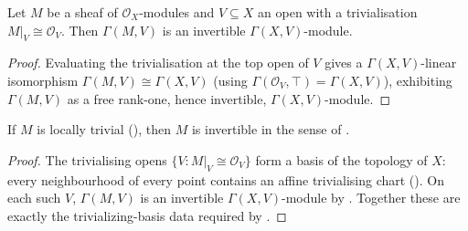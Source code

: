 \begin{lemma}
  \label{lem:isInvertible_of_restrict_iso}
  \leanok
  Let \(M\) be a sheaf of \(\mathcal{O}_X\)-modules and \(V \subseteq X\)
  an open with a trivialisation \(M|_V \cong \mathcal{O}_V\). Then
  \(\Gamma(M, V)\) is an invertible \(\Gamma(X, V)\)-module.
\end{lemma}
\begin{proof}
  \leanok
  Evaluating the trivialisation at the top open of \(V\) gives a
  \(\Gamma(X,V)\)-linear isomorphism \(\Gamma(M, V) \cong \Gamma(X, V)\)
  (using \(\Gamma(\mathcal{O}_V, \top) = \Gamma(X, V)\)), exhibiting
  \(\Gamma(M,V)\) as a free rank-one, hence invertible, \(\Gamma(X,V)\)-module.
\end{proof}

\begin{theorem}
  \label{thm:isLocallyTrivial_isInvertibleGr}
  \leanok
  If \(M\) is locally trivial (), then \(M\)
  is invertible in the sense of .
\end{theorem}
\begin{proof}
  \leanok
  The trivialising opens \(\{V : M|_V \cong \mathcal{O}_V\}\) form a
  basis of the topology of \(X\): every neighbourhood of every point
  contains an affine trivialising chart
  (). On each
  such \(V\), \(\Gamma(M,V)\) is an invertible \(\Gamma(X,V)\)-module by
  . Together these are exactly
  the trivializing-basis data required by .
\end{proof}

